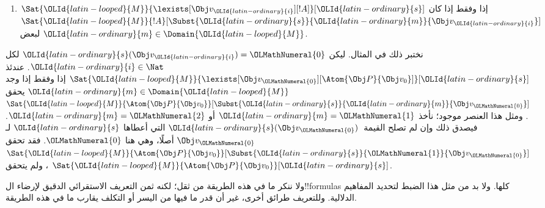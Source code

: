 \documentclass[../../../include/open-logic-section]{subfiles}
\begin{document}
\begin{enumerate}
  \item $\Sat{{\OLId{latin-looped}{M}}}{\lexists[\Obj v_{\OLId{latin-ordinary}{i}}][!A]}[{\OLId{latin-ordinary}{s}}]$ إذا وفقط إذا كان
  $\Sat{{\OLId{latin-looped}{M}}}{!A}[\Subst{{\OLId{latin-ordinary}{s}}}{{\OLId{latin-ordinary}{m}}}{\Obj v_{\OLId{latin-ordinary}{i}}}]$ لبعض
  ${\OLId{latin-ordinary}{m}} \in \Domain{{\OLId{latin-looped}{M}}}$.
\end{enumerate}
نختبر ذلك في المثال. ليكن ${\OLId{latin-ordinary}{s}}(\Obj v_{\OLId{latin-ordinary}{i}}) = {\OLMathNumeral{0}}$ لكل
${\OLId{latin-ordinary}{i}} \in \Nat$. عندئذ
$\Sat{{\OLId{latin-looped}{M}}}{\lexists[\Obj v_{\OLMathNumeral{0}}][\Atom{\Obj P}{\Obj v_0}]}[{\OLId{latin-ordinary}{s}}]$
إذا وفقط إذا وجد ${\OLId{latin-ordinary}{m}} \in \Domain{{\OLId{latin-looped}{M}}}$ يحقق
$\Sat{{\OLId{latin-looped}{M}}}{\Atom{\Obj P}{\Obj v_0}}[\Subst{{\OLId{latin-ordinary}{s}}}{{\OLId{latin-ordinary}{m}}}{\Obj v_{\OLMathNumeral{0}}}]$.
ومثل هذا العنصر موجود؛ نأخذ ${\OLId{latin-ordinary}{m}} = {\OLMathNumeral{1}}$ أو ${\OLId{latin-ordinary}{m}} = {\OLMathNumeral{2}}$.
فيصدق ذلك وإن لم تصلح القيمة~${\OLId{latin-ordinary}{s}}(\Obj v_{\OLMathNumeral{0}})$ التي أعطاها ${\OLId{latin-ordinary}{s}}$
لـ$\Obj v_{\OLMathNumeral{0}}$ أصلًا، وهي هنا ${\OLMathNumeral{0}}$. فقد تحقق
$\Sat{{\OLId{latin-looped}{M}}}{\Atom{\Obj P}{\Obj v_0}}[\Subst{{\OLId{latin-ordinary}{s}}}{{\OLMathNumeral{1}}}{\Obj v_{\OLMathNumeral{0}}}]$،
ولم يتحقق $\Sat{{\OLId{latin-looped}{M}}}{\Atom{\Obj P}{\Obj v_0}}[{\OLId{latin-ordinary}{s}}]$.

ولا ننكر ما في هذه الطريقة من ثقل؛ لكنه ثمن التعريف الاستقرائي
الدقيق لإرضاء ال!!{formula}s كلها. ولا بد من مثل هذا الضبط
لتحديد المفاهيم الدلالية. وللتعريف طرائق أخرى، غير أن قدر ما فيها
من اليسر أو التكلف يقارب ما في هذه الطريقة.
\end{document}
